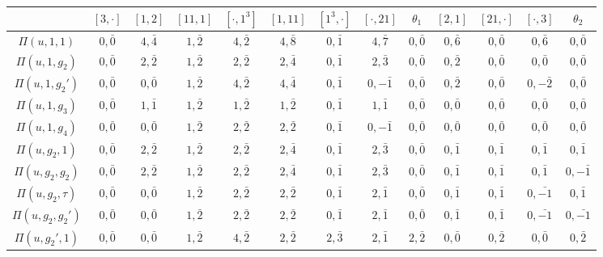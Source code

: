 \begin{landscape}
    \begin{table}[!ht]
        \centering
        {\small
        \begin{tabular}{|c|cccc|cccc|cccc|}
            \hline
        & $[3,\cdot]$ & $[1,2]$ & $[11,1]$ & $[\cdot,1^3]$ & $[1,11]$ & $[1^3,\cdot]$ & $[\cdot,21]$ & $\theta_1$ & $[2,1]$ & $[21,\cdot]$ & $[\cdot,3]$ & $\theta_2$ \\\hline
        $\Pi(u,1,1)$ & $0,\bar0$ & $4,\bar{4}$ & $1,\bar2$ & $4,\bar2$ & $4,\bar{8}$ & $0,\bar1$ & $4,\bar{7}$ & $0,\bar0$ & $0,\bar{6}$ & $0,\bar0$ & $0,\bar{6}$ & $0,\bar0$\\
        $\Pi(u,1,g_2)$ & $0,\bar0$ & $2,\bar2$ & $1,\bar2$ & $2,\bar2$ & $2,\bar{4}$ & $0,\bar1$ & $2,\bar{3}$ & $0,\bar0$ & $0,\bar2$ & $0,\bar0$ & $0,\bar0$ & $0,\bar0$ \\
        $\Pi(u,1,g_2')$ & $0,\bar0$ & $0,\bar0$ & $1,\bar2$ & $4,\bar2$ & $4,\bar{4}$ & $0,\bar1$ & $0,-\bar1$ & $0,\bar0$ & $0,\bar2$ & $0,\bar0$ & $0,-\bar2$ & $0,\bar0$ \\
        $\Pi(u,1,g_3)$ & $0,\bar0$ & $1,\bar1$ & $1,\bar2$ & $1,\bar2$ & $1,\bar2$ & $0,\bar1$ & $1,\bar1$ & $0,\bar0$ & $0,\bar0$ & $0,\bar0$ & $0,\bar0$ & $0,\bar0$ \\
        $\Pi(u,1,g_4)$ & $0,\bar0$ & $0,\bar0$ & $1,\bar2$ & $2,\bar2$ & $2,\bar2$ & $0,\bar1$ & $0,-\bar1$ & $0,\bar0$ & $0,\bar0$ & $0,\bar0$ & $0,\bar0$ & $0,\bar0$ \\\hline
        $\Pi(u,g_2,1)$ & $0,\bar0$ & $2,\bar2$ & $1,\bar2$ & $2,\bar2$ & $2,\bar{4}$ & $0,\bar1$ & $2,\bar{3}$ & $0,\bar0$ & $0,\bar1$ & $0,\bar1$ & $0,\bar1$ & $0,\bar1$ \\
        $\Pi(u,g_2,g_2)$ & $0,\bar0$ & $2,\bar2$ & $1,\bar2$ & $2,\bar2$ & $2,\bar{4}$ & $0,\bar1$ & $2,\bar{3}$ & $0,\bar0$ & $0,\bar1$ & $0,\bar1$ & $0,\bar1$ & $0,-\bar1$ \\
        $\Pi(u,g_2,\tau)$ & $0,\bar0$ & $0,\bar0$ & $1,\bar2$ & $2,\bar2$ & $2,\bar2$ & $0,\bar1$ & $2,\bar1$ & $0,\bar0$ & $0,\bar1$ & $0,\bar1$ & $0,\bar{-1}$ & $0,\bar1$ \\
        $\Pi(u,g_2,g_2')$ & $0,\bar0$ & $0,\bar0$ & $1,\bar2$ & $2,\bar2$ & $2,\bar2$ & $0,\bar1$ & $2,\bar1$ & $0,\bar0$ & $0,\bar1$ & $0,\bar1$ & $0,\bar{-1}$ & $0,\bar{-1}$ \\\hline

        $\Pi(u,g_2',1)$ & $0,\bar0$ & $0,\bar0$ & $1,\bar2$ & $4,\bar2$ & $2,\bar2$ & $2,\bar{3}$ & $2,\bar1$ & $2,\bar2$ & $0,\bar0$ & $0,\bar2$ & $0,\bar0$ & $0,\bar2$\\


\end{tabular}}
\end{table}
\end{landscape}
